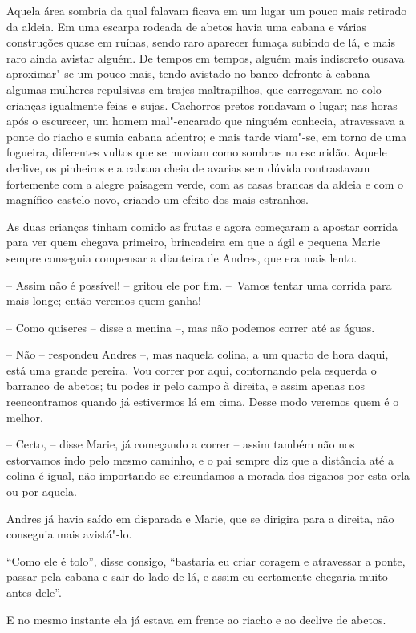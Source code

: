 Aquela área sombria da qual falavam ficava em um lugar um pouco mais
retirado da aldeia. Em uma escarpa rodeada de abetos havia uma cabana e
várias construções quase em ruínas, sendo raro aparecer fumaça
subindo de lá, e mais raro ainda avistar alguém. De tempos em tempos,
alguém mais indiscreto ousava aproximar"-se um pouco mais, tendo
avistado no banco defronte à cabana algumas mulheres repulsivas em
trajes maltrapilhos, que carregavam no colo crianças \mbox{igualmente} feias e
sujas. Cachorros pretos rondavam o lugar; nas horas após o escurecer,
um homem mal"-encarado que ninguém conhecia, atravessava a ponte do
riacho e sumia cabana adentro; e mais tarde viam"-se, em torno de uma
fogueira, diferentes vultos que se moviam como sombras na escuridão.
Aquele declive, os pinheiros e a cabana cheia de avarias sem dúvida
contrastavam fortemente com a alegre paisagem verde, com as casas
brancas da aldeia e com o magnífico castelo novo, criando um efeito dos
mais estranhos.

As duas crianças tinham comido as frutas e agora começaram a apostar
corrida para ver quem chegava primeiro, brincadeira em que a ágil e
pequena Marie sempre conseguia compensar a dianteira de Andres, que era
mais lento.

-- Assim não é possível! -- gritou ele por fim. \mbox{-- Vamos}
tentar uma corrida para mais longe; então veremos quem ganha!

-- Como quiseres -- disse a menina --, mas não podemos
correr até as águas.

-- Não -- respondeu Andres --, mas naquela colina, a um
quarto de hora daqui, está uma grande pereira. Vou correr por aqui,
contornando pela esquerda o barranco de abetos; tu podes ir pelo campo
à direita, e assim apenas nos reencontramos quando já estivermos lá em
cima. Desse modo veremos quem é o melhor.

-- Certo, -- disse Marie, já começando a correr -- assim
também não nos estorvamos indo pelo mesmo caminho, e o pai sempre diz
que a distância até a colina é igual, não importando se circundamos a
morada dos ciganos por esta orla ou por aquela.

Andres já havia saído em disparada e Marie, que se dirigira para a
direita, não conseguia mais avistá"-lo.

``Como ele é tolo'', disse consigo, ``bastaria eu criar coragem e 
atravessar a ponte, passar pela cabana e sair do lado de lá, e assim 
eu certamente chegaria muito antes dele''.

E no mesmo instante ela já estava em frente ao riacho e ao declive de
abetos.

